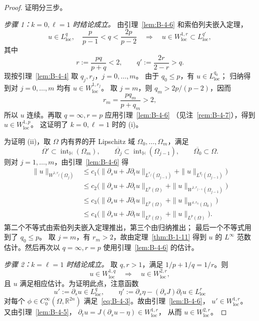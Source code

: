 \begin{proof}
证明分三步。

\emph{步骤 1：$k=0,\ell=1$ 时结论成立。}
由引理~\ref{lem:B-4-6} 和索伯列夫嵌入定理，
\[
  u\in L^q_{\mathrm{loc}},\quad
  \frac p{p-1}<q<\frac{2p}{p-2}
  \quad\Longrightarrow\quad
  u\in W^{1,r}_{\mathrm{loc}}\subset L^{q'}_{\mathrm{loc}},
\]
其中
\[
  r:=\frac{pq}{p+q}<2,\qquad q':=\frac{2r}{2-r}>q.
\]
现按引理~\ref{lem:B-4-4} 取 $q_j,r_j$，$j=0,\ldots,m$。
由于 $q_0\le p$，有 $u\in L^{q_0}_{\mathrm{loc}}$；
归纳得到对 $j=0,\ldots,m$ 均有 $u\in W^{1,r_j}_{\mathrm{loc}}$。
取 $j=m$，则 $q_m>2p/(p-2)$，因而
\[
  r_m=\frac{pq_m}{p+q_m}>2,
\]
所以 $u$ 连续。再取 $q=\infty,r=p$ 应用引理~\ref{lem:B-4-6}
（见注~\ref{rem:B-4-7}），得到 $u\in W^{1,p}_{\mathrm{loc}}$。
这证明了 $k=0,\ell=1$ 时的 (i)。

为证明 (ii)，取 $\Omega$ 内有界的开 Lipschitz 域
$\Omega_0,\ldots,\Omega_m$，满足
\[
  \overline{\Omega'}\subset\operatorname{int}_{\mathbb H}(\Omega_m),
  \qquad \overline{\Omega_j}\subset
  \operatorname{int}_{\mathbb H}(\Omega_{j-1}),
  \qquad \overline{\Omega_0}\subset\Omega.
\]
则对 $j=1,\ldots,m$，由引理~\ref{lem:B-4-6} 得
\begin{align*}
  \|u\|_{W^{1,r_j}(\Omega_j)}
  &\le c_1\bigl(\|\partial_su+J\partial_tu\|_{L^{r_j}(\Omega_{j-1})}
       +\|u\|_{L^{q_j}(\Omega_{j-1})}\bigr)\\
  &\le c_2\bigl(\|\partial_su+J\partial_tu\|_{L^p(\Omega)}
       +\|u\|_{W^{1,r_{j-1}}(\Omega_{j-1})}\bigr)\\
  &\le c_3\bigl(\|\partial_su+J\partial_tu\|_{L^p(\Omega)}
       +\|u\|_{W^{1,r_0}(\Omega_0)}\bigr)\\
  &\le c_4\bigl(\|\partial_su+J\partial_tu\|_{L^p(\Omega)}
       +\|u\|_{L^p(\Omega)}\bigr).
\end{align*}
第二个不等式由索伯列夫嵌入定理推出，第三个由归纳推出；
最后一个不等式用到了 $q_0\le p$。
取 $j=m$，有 $r_m>2$，故由定理~\ref{thm:B-1-11}
得到 $u$ 的 $L^\infty$ 范数估计。然后再次以 $q=\infty,r=p$
使用引理~\ref{lem:B-4-6} 的估计。

\emph{步骤 2：$k=\ell=1$ 时结论成立。}
取 $q,r>1$，满足 $1/p+1/q=1/r$。则
\begin{equation}\label{eq:B-4-7}
  u\in W^{1,q}_{\mathrm{loc}}
  \quad\Longrightarrow\quad u\in W^{2,r}_{\mathrm{loc}},
\end{equation}
且 $u$ 满足相应估计。为证明此点，注意函数
\[
  u':=\partial_su\in L^q_{\mathrm{loc}},\qquad
  \eta':=\partial_s\eta-(\partial_sJ)\partial_tu\in L^r_{\mathrm{loc}}
\]
对每个 $\phi\in C_0^\infty(\Omega,\mathbb R^{2n})$
满足~\eqref{eq:B-4-3}。故由引理~\ref{lem:B-4-6}，
$u'\in W^{1,r}_{\mathrm{loc}}$。
又由引理~\ref{lem:B-4-5}，
$\partial_tu=J(\partial_su-\eta)\in W^{1,r}_{\mathrm{loc}}$，
从而 $u\in W^{2,r}_{\mathrm{loc}}$。


\end{proof}
